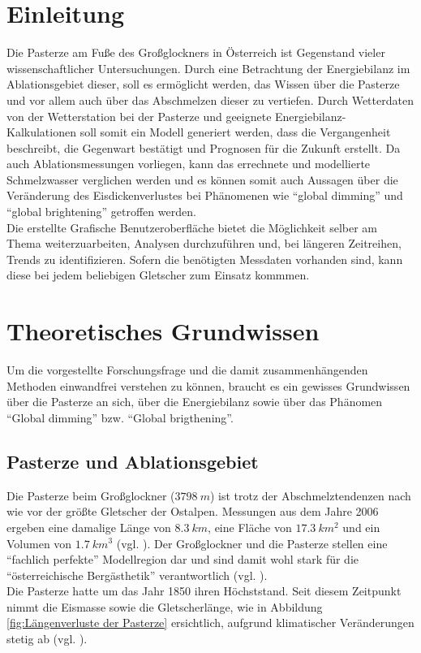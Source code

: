 \documentclass[12pt,a4paper]{article}
\begin{document}
\section{Einleitung}
Die Pasterze am Fuße des Großglockners in Österreich ist Gegenstand vieler wissenschaftlicher Untersuchungen. Durch eine Betrachtung der Energiebilanz im Ablationsgebiet dieser, soll es ermöglicht werden, das Wissen über die Pasterze und vor allem auch über das Abschmelzen dieser zu vertiefen. Durch Wetterdaten von der Wetterstation bei der Pasterze und geeignete Energiebilanz-Kalkulationen soll somit ein Modell generiert werden, dass die Vergangenheit beschreibt, die Gegenwart bestätigt und Prognosen für die Zukunft erstellt. Da auch Ablationsmessungen vorliegen, kann das errechnete und modellierte Schmelzwasser verglichen werden und es können somit auch Aussagen über die Veränderung des Eisdickenverlustes bei Phänomenen wie ``global dimming'' und ``global brightening'' getroffen werden. \\
Die erstellte Grafische Benutzeroberfläche bietet die Möglichkeit selber am Thema weiterzuarbeiten, Analysen durchzuführen und, bei längeren Zeitreihen, Trends zu identifizieren. Sofern die benötigten Messdaten vorhanden sind, kann diese bei jedem beliebigen Gletscher zum Einsatz kommmen.


\section{Theoretisches Grundwissen}
Um die vorgestellte Forschungsfrage und die damit zusammenhängenden Methoden einwandfrei verstehen zu können, braucht es ein gewisses Grundwissen über die Pasterze an sich, über die Energiebilanz sowie über das Phänomen ``Global dimming'' bzw. ``Global brigthening''.

\subsection{Pasterze und Ablationsgebiet}
Die Pasterze beim Großglockner ($3798~m$) ist trotz der Abschmelztendenzen nach wie vor der größte Gletscher der Ostalpen. Messungen aus dem Jahre 2006 ergeben eine damalige Länge von $8.3~km$, eine Fläche von $17.3~km^2$ und ein Volumen von $1.7~km^3$ (vgl. \cite[10]{Pasterze}). Der Großglockner und die Pasterze stellen eine ``fachlich perfekte'' Modellregion dar und sind damit wohl stark für die ``österreichische Bergästhetik'' verantwortlich (vgl. \cite[13]{Pasterze}).\\
Die Pasterze hatte um das Jahr 1850 ihren Höchststand. Seit diesem Zeitpunkt nimmt die Eismasse sowie die Gletscherlänge, wie in Abbildung \ref{fig:Längenverluste der Pasterze} ersichtlich, aufgrund klimatischer Veränderungen stetig ab (vgl. \cite[17]{Pasterze}).\\
\end{document}
